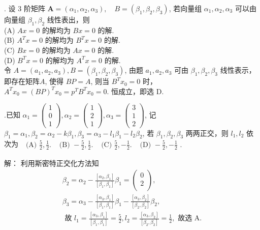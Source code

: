 \documentclass{article}
\begin{document}
{.} 设 3 阶矩阵 $\boldsymbol{A}=\left(\alpha_{1}, \alpha_{2}, \alpha_{3}\right), \quad B=\left(\beta_{1}, \beta_{2}, \beta_{3}\right)$, 若向量组 $\alpha_{1}, \alpha_{2}, \alpha_{3}$ 可以由向量组 $\beta_{1}, \beta_{2}$
线性表出，则\\
(A) $A x=0$ 的解均为 $B x=0$ 的解.\\
(B) $A^{T} x=0$ 的解均为 $B^{T} x=0$ 的解.\\
(C) $B x=0$ 的解均为 $A x=0$ 的解.\\
(D) $B^{T} x=0$ 的解均为 $A^{T} x=0$ 的解. \\
令 $A=\left(a_{1}, a_{2}, a_{3}\right), B=\left(\beta_{1}, \beta_{2}, \beta_{3}\right)$, 由题 $a_{1}, a_{2}, a_{3}$ 可由 $\beta_{1}, \beta_{2}, \beta_{3}$ 线性表示，即存在矩阵$A$,
使得 $B P=A$, 则当 $B^{T} x_{0}=0$ 时， $A^{T} x_{0}=(B P)^{T} x_{0}=p^{T} B^{T} x_{0}=0 .$ 恒成立，即选 $\mathrm{D}$.

    {.}已知 $\alpha_{1}=\left(\begin{array}{l}1 \\ 0 \\ 1\end{array}\right), \alpha_{2}=\left(\begin{array}{l}1 \\ 2 \\ 1\end{array}\right), \alpha_{3}=\left(\begin{array}{l}3 \\ 1 \\ 2\end{array}\right)$, 记 $\beta_{1}=\alpha_{1}, \beta_{2}=\alpha_{2}-k \beta_{1}, \beta_{3}=\alpha_{3}-l_{1} \beta_{1}-l_{2} \beta_{2}$,
若 $\beta_{1}, \beta_{2},\beta_{3}$ 两两正交，则 $l_{1}, l_{2}$ 依次为
$\begin{array}{llll}\text { (A) } \frac{5}{2}, \frac{1}{2} . & \text { (B) }-\frac{5}{2}, \frac{1}{2} . & \text { (C) } \frac{5}{2},-\frac{1}{2} . & \text { (D) }-\frac{5}{2},-\frac{1}{2} \text { . }\end{array}$

解： 利用斯密特正交化方法知
$$\begin{array}{c}
        \beta_{2}=\alpha_{2}-\frac{\left[\alpha_{2}, \beta_{1}\right]}{\left[\beta_{1}, \beta_{1}\right]} \beta_{1}=\left(\begin{array}{l}
                0 \\
                2 \\
            \end{array}\right),                                                \\
        \beta_{3}=\alpha_{3}-\frac{\left[\alpha_{3}, \beta_{1}\right]}{\left[\beta_{1}, \beta_{1}\right]} \beta_{1}-\frac{\left[\alpha_{3}, \beta_{2}\right]}{\left[\beta_{2}, \beta_{2}\right]} \beta_{2}, \\
        \text { 故 } l_{1}=\frac{\left[\alpha_{3}, \beta_{1}\right]}{\left[\beta_{1}, \beta_{1}\right]}=\frac{5}{2}, l_{2}=\frac{\left[\alpha_{3}, \beta_{2}\right]}{\left[\beta_{2}, \beta_{2}\right]}=\frac{1}{2}, \text { 故选 } \mathrm{A} .
    \end{array}$$\\
\end{document}
